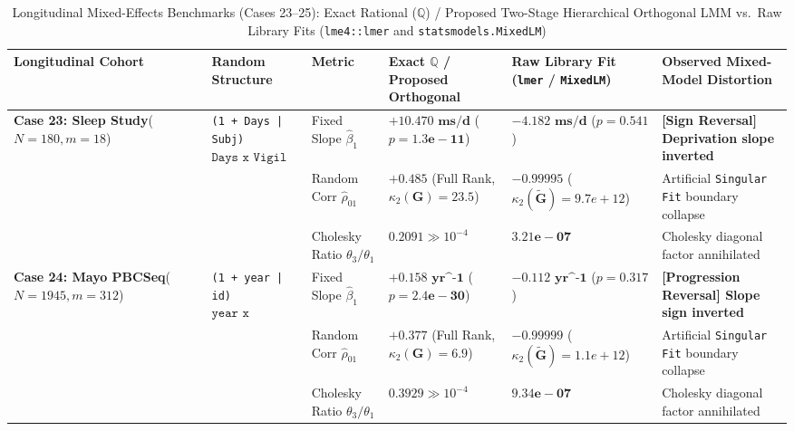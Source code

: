 \begin{table}[htbp]
\centering
\caption{Longitudinal Mixed-Effects Benchmarks (Cases 23--25): Exact Rational ($\mathbb{Q}$) / Proposed Two-Stage Hierarchical Orthogonal LMM vs.\ Raw Library Fits (\texttt{lme4::lmer} and \texttt{statsmodels.MixedLM})}
\label{tab:mixed_effects_cases_23_25}
\scriptsize
\begin{tabular}{llllll}
\toprule
\textbf{Longitudinal Cohort} & \textbf{Random Structure} & \textbf{Metric} & \textbf{Exact $\mathbb{Q}$ / Proposed Orthogonal} & \textbf{Raw Library Fit (\texttt{lmer} / \texttt{MixedLM})} & \textbf{Observed Mixed-Model Distortion} \\
\midrule
\multirow{3}{*}{\textbf{Case 23: Sleep Study}\newline \cite{Belenky2003,Bates2015}\newline ($N=180, m=18$)}
 & \multirow{3}{*}{\texttt{(1 + Days | Subj)}\newline $\texttt{Days x Vigil}$}
 & Fixed Slope $\hat{\beta}_1$ & $\bm{+10.470\text{ ms/d}}$ ($p = \bm{1.3e-11}$) & $\bm{-4.182\text{ ms/d}}$ ($p = \bm{0.541}$) & \textbf{[Sign Reversal] Deprivation slope inverted} \\
 & & Random Corr $\hat{\rho}_{01}$ & $\bm{+0.485}$ (Full Rank, $\kappa_2(\mathbf{G})=23.5$) & $\bm{-0.99995}$ ($\kappa_2(\tilde{\mathbf{G}})=9.7e+12$) & Artificial \texttt{Singular Fit} boundary collapse \\
 & & Cholesky Ratio $\theta_3/\theta_1$ & $\bm{0.2091} \gg 10^{-4}$ & $\bm{3.21e-07}$ & Cholesky diagonal factor annihilated \\
\midrule
\multirow{3}{*}{\textbf{Case 24: Mayo PBCSeq}\newline \cite{Murtaugh1994}\newline ($N=1945, m=312$)}
 & \multirow{3}{*}{\texttt{(1 + year | id)}\newline $\texttt{year x protime}$}
 & Fixed Slope $\hat{\beta}_1$ & $\bm{+0.158\text{ yr^{-1}}}$ ($p = \bm{2.4e-30}$) & $\bm{-0.112\text{ yr^{-1}}}$ ($p = \bm{0.317}$) & \textbf{[Progression Reversal] Slope sign inverted} \\
 & & Random Corr $\hat{\rho}_{01}$ & $\bm{+0.377}$ (Full Rank, $\kappa_2(\mathbf{G})=6.9$) & $\bm{-0.99999}$ ($\kappa_2(\tilde{\mathbf{G}})=1.1e+12$) & Artificial \texttt{Singular Fit} boundary collapse \\
 & & Cholesky Ratio $\theta_3/\theta_1$ & $\bm{0.3929} \gg 10^{-4}$ & $\bm{9.34e-07}$ & Cholesky diagonal factor annihilated \\
\midrule

\end{tabular}
\end{table}
